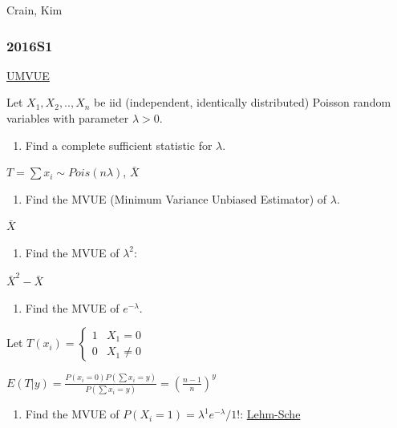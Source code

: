 \documentclass[10pt,twocolumn,portrait]{article}
\providecommand{\tightlist}{%
  \setlength{\itemsep}{0pt}\setlength{\parskip}{0pt}}
\begin{document}
Crain, Kim

\hypertarget{s1-4}{%
\subsubsection{2016S1}\label{s1-4}}

\protect\hyperlink{section-5}{UMVUE}

Let \(X_1,X_2,..,X_n\) be iid (independent, identically distributed)
Poisson random variables with parameter \(\lambda>0\).

\begin{enumerate}
\def\labelenumi{(\alph{enumi})}
\tightlist
\item
  Find a complete sufficient statistic for \(\lambda\).
\end{enumerate}

\(T=\sum x_i\sim Pois(n\lambda)\), \(\bar X\)

\begin{enumerate}
\def\labelenumi{(\alph{enumi})}
\setcounter{enumi}{1}
\tightlist
\item
  Find the MVUE (Minimum Variance Unbiased Estimator) of \(\lambda\).
\end{enumerate}

\(\bar X\)

\begin{enumerate}
\def\labelenumi{(\alph{enumi})}
\setcounter{enumi}{2}
\tightlist
\item
  Find the MVUE of \(\lambda^2\):
\end{enumerate}

\(\bar X^2-\bar X\)

\begin{enumerate}
\def\labelenumi{(\alph{enumi})}
\setcounter{enumi}{3}
\tightlist
\item
  Find the MVUE of \(e^{-\lambda}\).
\end{enumerate}

Let \(T(x_i)=\begin{cases}1&X_1=0\\0&X_1\neq0\end{cases}\)

\(E(T|y)=\frac{P(x_i=0)P(\sum x_i=y)}{P(\sum x_i=y)}=(\frac{n-1}{n})^y\)

\begin{enumerate}
\def\labelenumi{(\alph{enumi})}
\setcounter{enumi}{4}
\tightlist
\item
  Find the MVUE of \(P(X_i=1)=\lambda^1e^{-\lambda}/1!\):
  \protect\hyperlink{Lehm-Sche}{Lehm-Sche}
\end{enumerate}
\end{document}
